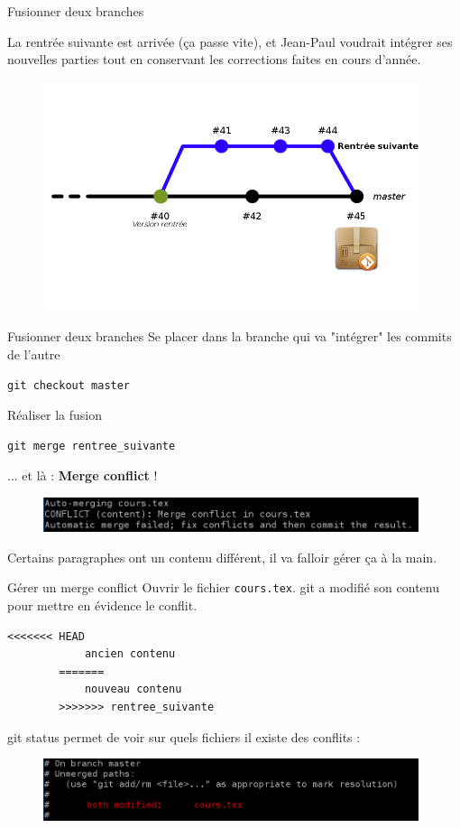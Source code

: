 \documentclass{beamer}
\begin{document}
\begin{frame}{Fusionner deux branches}

	La rentrée suivante est arrivée (ça passe vite), et Jean-Paul voudrait intégrer ses nouvelles parties tout en conservant les corrections faites en cours d'année. 
	\begin{figure}
		\centering
		\includegraphics[width=11cm]{img/repo5}
	\end{figure}
\end{frame}

\begin{frame}[fragile]{Fusionner deux branches}
	Se placer dans la branche qui va "intégrer" les commits de l'autre
	\begin{lstlisting}[frame=single]
		git checkout master
	\end{lstlisting}
	
	Réaliser la fusion
	\begin{lstlisting}[frame=single]
		git merge rentree_suivante
	\end{lstlisting}
	
	... et là : \textbf{Merge conflict} !
	\begin{figure}
		\centering
		\includegraphics[width=11cm]{img/shot8}
	\end{figure}
	Certains paragraphes ont un contenu différent, il va falloir gérer ça à la main.
\end{frame}

\begin{frame}[fragile]{Gérer un merge conflict}
	Ouvrir le fichier \texttt{cours.tex}. git a modifié son contenu pour mettre en évidence le conflit.
	\begin{lstlisting}[frame=single]
		<<<<<<< HEAD
		    ancien contenu
		=======
		    nouveau contenu
		>>>>>>> rentree_suivante
	\end{lstlisting}
	
	git status permet de voir sur quels fichiers il existe des conflits :
	\begin{figure}
		\centering
		\includegraphics[width=11cm]{img/shot9}
	\end{figure}
\end{frame}
\end{document}
